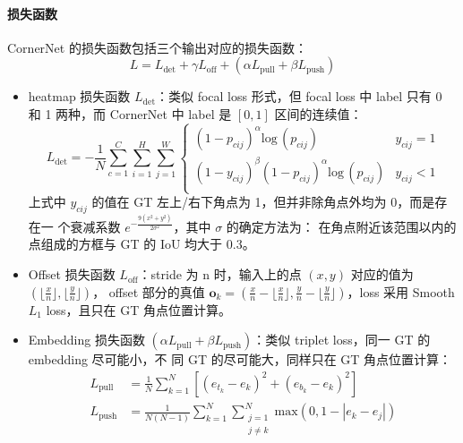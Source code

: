\paragraph{损失函数}
CornerNet 的损失函数包括三个输出对应的损失函数：
\begin{equation}
  \label{eq:cornernet-loss}
  L = L_{\mathrm{det}} + \gamma L_{\mathrm{off}} + (\alpha L_{\mathrm{pull}} + \beta L_{\mathrm{push}})
\end{equation}

\begin{itemize}
  \item heatmap 损失函数 $L_{\mathrm{det}}$：类似 focal loss 形式，但 focal loss
    中 label 只有 0 和 1 两种，而 CornerNet 中 label 是 $[0, 1]$ 区间的连续值：
    \begin{equation}
      \label{equ:cornernet-det-loss}
      L_{\mathrm{det}} = -\frac{1}{N} \sum_{c=1}^{C} \sum_{i=1}^{H} \sum_{j=1}^{W}
      \left\{
        \begin{array}{lr}
           (1-p_{cij})^{\alpha}\mathrm{log}\,(p_{cij}) & y_{cij} = 1 \\
           (1-y_{cij})^{\beta} (1-p_{cij})^{\alpha} \mathrm{log}\,(p_{cij}) & y_{cij} < 1 \\
        \end{array}
      \right.
    \end{equation}
    上式中 $y_{cij}$ 的值在 GT 左上/右下角点为 1，但并非除角点外均为 0，而是存在一
    个衰减系数 $e^{-\frac{9(x^2+y^2)}{2\sigma^2}}$，其中 $\sigma$ 的确定方法为：
    在角点附近该范围以内的点组成的方框与 GT 的 IoU 均大于 0.3。
  \item Offset 损失函数 $L_{\mathrm{off}}$：stride 为 n 时，输入上的点 $(x, y)$
    对应的值为 $( \lfloor \frac{x}{n} \rfloor, \lfloor \frac{y}{n} \rfloor)$，
    offset 部分的真值 $\mathbf{o}_k = \left( \frac{x}{n} - \lfloor \frac{x}{n}
      \rfloor, \frac{y}{n} - \lfloor \frac{y}{n} \rfloor \right)$，loss 采用
    Smooth $L_1$ loss，且只在 GT 角点位置计算。
  \item Embedding 损失函数 $(\alpha L_{\mathrm{pull}} + \beta
    L_{\mathrm{push}})$：类似 triplet loss，同一 GT 的 embedding 尽可能小，不
    同 GT 的尽可能大，同样只在 GT 角点位置计算：
    \begin{align}
      \label{equ:cornernet-em-loss-pull}
      L_{\mathrm{pull}} & = \frac{1}{N} \sum_{k=1}^{N} \left[ (e_{t_k} - e_k)^2 + (e_{b_k} - e_k)^2 \right] \\
      \label{equ:cornernet-em-loss-push}
      L_{\mathrm{push}} & = \frac{1}{N(N-1)} \sum_{k=1}^{N} \sum_{\substack{j=1 \\ j \neq k}}^{N} \mathrm{max} (0, 1-|e_k-e_j|)
    \end{align}
\end{itemize}

